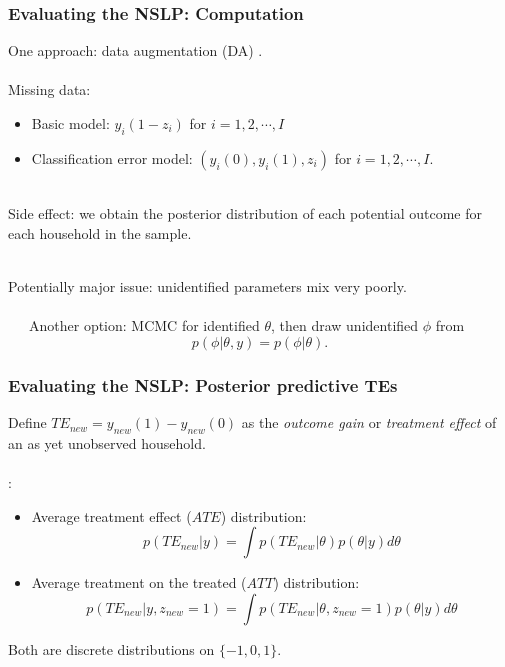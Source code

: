 \documentclass[xcolor=dvipsnames]{beamer}
\begin{document}
\begin{frame}
\frametitle{Evaluating the NSLP: Computation}
One approach: data augmentation (DA) \citep{tanner1987calculation}.\\~\\

Missing data:
\begin{itemize}
\item Basic model: $y_i(1-z_i)$ for $i=1,2,\cdots,I$
\item Classification error model: $(y_i(0), y_i(1), z_i)$ for $i=1,2, \cdots,I$.\\~
\end{itemize}

\pause Side effect: we obtain the posterior distribution of each potential outcome for each household in the sample.\\~

\pause Potentially major issue: unidentified parameters mix very poorly. \\~\\
\ \ \ Another option: MCMC for identified $\theta$, then draw unidentified $\phi$ from
\[
p(\phi|\theta,y)=p(\phi|\theta).
\]
\end{frame}


\begin{frame}
    \frametitle{Evaluating the NSLP: Posterior predictive TEs}
Define $TE_{new}=y_{new}(1) - y_{new}(0)$ as the {\it outcome gain} or {\it treatment effect} of an as yet unobserved household.\\~\\

\cite{poirier2003predictive}:
\begin{itemize}
\item[] Average treatment effect ($ATE$) distribution: 
  \[
  p(TE_{new}|y) = \int p(TE_{new}|\theta)p(\theta|y)d\theta
  \]
\item[] Average treatment on the treated ($ATT$) distribution: 
  \[
  p(TE_{new}|y,z_{new}=1) = \int p(TE_{new}|\theta, z_{new}=1)p(\theta|y)d\theta
  \]
\end{itemize}
Both are discrete distributions on $\{-1,0,1\}$.
\end{frame}
\end{document}
